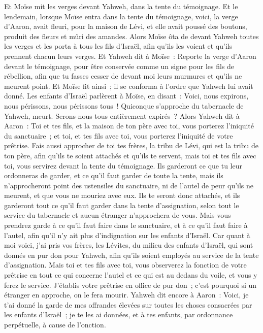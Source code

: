 \begin{multicols}{2}
Et Moïse mit les verges devant Yahweh, dans la tente du témoignage.
Et le lendemain, lorsque Moïse entra dans la tente du témoignage, voici, la verge d'Aaron, avait fleuri, pour la maison de Lévi, et elle avait poussé des boutons, produit des fleurs et mûri des amandes.
Alors Moïse ôta de devant Yahweh toutes les verges et les porta à tous les fils d'Israël, afin qu'ils les voient et qu'ils prennent chacun leurs verges.
Et Yahweh dit à Moïse~: Reporte la verge d'Aaron devant le témoignage, pour être conservée comme un signe pour les fils de rébellion, afin que tu fasses cesser de devant moi leurs murmures et qu'ils ne meurent point.
Et Moïse fit ainsi~; il se conforma à l'ordre que Yahweh lui avait donné.
Les enfants d'Israël parlèrent à Moïse, en disant~: Voici, nous expirons, nous périssons, nous périssons tous~!
Quiconque s'approche du tabernacle de Yahweh, meurt. Serons-nous tous entièrement expirés~?
\VerseOne{}Alors Yahweh dit à Aaron~: Toi et tes fils, et la maison de ton père avec toi, vous porterez l'iniquité du sanctuaire~; et toi, et tes fils avec toi, vous porterez l'iniquité de votre prêtrise.
Fais aussi approcher de toi tes frères, la tribu de Lévi, qui est la tribu de ton père, afin qu'ils te soient attachés et qu'ils te servent, mais toi et tes fils avec toi, vous servirez devant la tente du témoignage.
Ils garderont ce que tu leur ordonneras de garder, et ce qu'il faut garder de toute la tente, mais ils n'approcheront point des ustensiles du sanctuaire, ni de l'autel de peur qu'ils ne meurent, et que vous ne mouriez avec eux.
Ils te seront donc attachés, et ils garderont tout ce qu'il faut garder dans la tente d'assignation, selon tout le service du tabernacle et aucun étranger n'approchera de vous.
Mais vous prendrez garde à ce qu'il faut faire dans le sanctuaire, et à ce qu'il faut faire à l'autel, afin qu'il n'y ait plus d'indignation sur les enfants d'Israël.
Car quant à moi voici, j'ai pris vos frères, les Lévites, du milieu des enfants d'Israël, qui sont donnés en pur don pour Yahweh, afin qu'ils soient employés au service de la tente d'assignation.
Mais toi et tes fils avec toi, vous observerez la fonction de votre prêtrise en tout ce qui concerne l'autel et ce qui est au dedans du voile, et vous y ferez le service. J'établis votre prêtrise en office de pur don~; c'est pourquoi si un étranger en approche, on le fera mourir.
Yahweh dit encore à Aaron~: Voici, je t'ai donné la garde de mes offrandes élevées sur toutes les choses consacrées par les enfants d'Israël~; je te les ai données, et à tes enfants, par ordonnance perpétuelle, à cause de l'onction.

\end{multicols}
